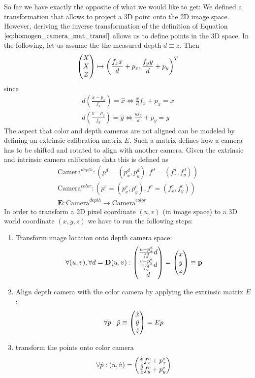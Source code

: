 So far we have exactly the opposite of what we would like to get: We defined a transformation that allows to project a 3D point onto the 2D image space. However, deriving the inverse transformation of the definition of Equation $\ref{eq:homogen_camera_mat_transf}$ allows us to define points in the 3D space. In the following, let us assume the the measured depth $d \equiv z$. Then
\begin{equation}
	\colvec[X]{X}{Z} \mapsto \left( \frac{f_x x}{d} + p_x, \frac{f_y y}{d} + p_y \right)^T
\end{equation}
since
\begin{equation}
\begin{aligned}
	d \left( \frac{x - p_x}{f_x} \right) = \hat{x} \Leftrightarrow \frac{\hat{x}}{d} f_x + p_x = x \\
	d \left( \frac{y - p_y}{f_y} \right) = \hat{y} \Leftrightarrow \frac{\hat{y} f_y}{d} + p_y = y 
\end{aligned}
\label{eq:depth_tranfomation}
\end{equation}
The aspect that color and depth cameras are not aligned can be modeled by defining an extrinsic calibration matrix $E$. Such a matrix defines how a camera has to be shifted and rotated to align with another camera. Given the extrinsic and intrinsic camera calibration data this is defined as
\begin{equation}
\begin{aligned}
	\text{Camera}^{depth} : \left( p^d = (p_x^d, p_y^d), f^d = (f_x^d, f_y^d)\right) \\
	\text{Camera}^{color} : \left( p^c = (p_x^c, p_y^c), f^c = (f_x^c, f_y^c)\right) \\
	\textbf{E} : \text{Camera}^{depth} \rightarrow \text{Camera}^{color}
\end{aligned}
\label{eq:calib_data}
\end{equation}
In order to transform a 2D pixel coordinate $\left( u, v \right)$ (in image space) to a 3D world coordinate $\left( x, y, z \right)$ we have to run the following steps:
\begin{enumerate}
\item Transform image location onto depth camera space:
\begin{equation}
	\forall (u, v), \forall d = \textbf{D}(u,v): \colvec[\frac{u - p_x^d}{f_x^d} d]{\frac{v - p_y^d}{f_y^d} d}{d} = \colvec[x]{y}{z} \equiv \bf{p}
\end{equation}
\item Align depth camera with the color camera by applying the extrinsic matrix $E$:
\begin{equation}
	\forall p: \hat{p} \equiv \colvec[\hat{x}]{\hat{y}}{\hat{z}} =  E p
\end{equation}
\item transform the points onto color camera
\begin{equation}
	\forall \hat{p} : \left( \hat{u}, \hat{v}\right) = \colvec{\frac{\hat{x}}{\hat{z}} f_x^c + p_x^c}{\frac{\hat{y}}{\hat{z}} f_y^c + p_y^c}
\end{equation}
\end{enumerate}

